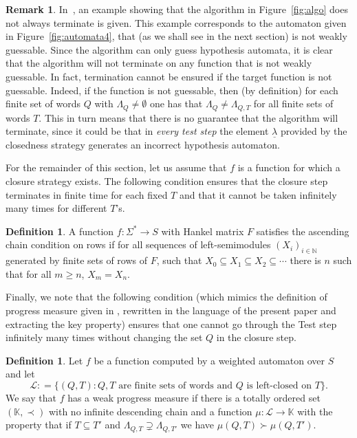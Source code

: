 \documentclass[10pt,a4paper]{amsart}
\theoremstyle{definition}
\newtheorem{rem}[thm]{Remark}
\newtheorem{defi}[thm]{Definition}
\numberwithin{equation}{section}
\numberwithin{theorem}{section}
\begin{document}
\begin{rem} 
In~\cite{HKRS20}, an example showing that the algorithm in Figure~\ref{fig:algo} does not always terminate is given. This example corresponds to the automaton given in Figure~\ref{fig:automata4}, that (as we shall see in the next section) is not weakly guessable. Since the algorithm can only guess hypothesis automata, it is clear that the algorithm will not terminate on any function that is not weakly guessable. In fact, termination  cannot be ensured if the target function is not guessable. Indeed, if the function is not guessable, then (by definition) for each finite set of words $Q$ with $\Lambda_Q \neq \emptyset$ one has that $\Lambda_Q \neq \Lambda_{Q, T}$ for all finite sets of words $T$. This in turn means that there is no guarantee that the algorithm will terminate, since it could be that in \emph{every test step} the  element $\underline{\lambda}$ provided by the closedness strategy generates an incorrect hypothesis automaton. \end{rem}

For the remainder of this section, let us assume that $f$ is a function for which a closure strategy exists. The following  condition ensures that the closure step terminates in finite time for each fixed $T$ and that it cannot be taken infinitely many times for different $T$'s.

\begin{defi}
	A function $f:\Sigma^* \to S$ with Hankel matrix $F$ satisfies the ascending chain condition on rows if for all sequences of left-semimodules $(X_i)_{i \in \mathbb{N}}$ generated by finite sets of rows of $F$, such that $X_0 \subseteq X_1 \subseteq X_2 \subseteq \cdots$
	there is $n$ such that for all $m \geq n$, $X_m = X_n$.
\end{defi}

Finally, we note that the following condition (which mimics the definition of progress measure given in \cite{HKRS20}, rewritten in the language of the present paper and extracting the key property) ensures that one cannot go through the Test step infinitely many times without changing the set $Q$ in the closure step. 

\begin{defi}
	Let $f$ be a function computed by a weighted automaton over $S$ and let
    $$\mathcal{L}: =\{(Q,T): Q, T \mbox{ are finite sets of words and } Q \mbox{ is left-closed on }T\}.$$
     We say that $f$ has a weak progress measure if there is a totally ordered set $(\mathbb{K},\prec)$ with no infinite descending chain and a function $\mu: \mathcal{L} \rightarrow \mathbb{K}$ with the property that if $T \subseteq T'$ and $\Lambda_{Q, T} \supsetneq \Lambda_{Q, T'}$  we have $\mu(Q, T)\succ  \mu(Q, T')$. 
\end{defi}
\end{document}
